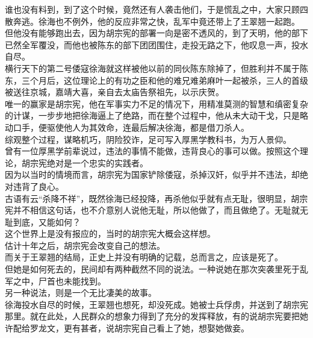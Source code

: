 \begin{multicols}{\theparacolNo}
谁也没有料到，到了这个时候，竟然还有人袭击他们，于是慌乱之中，大家只顾四散奔逃。徐海也不例外，他的反应非常之快，乱军中竟还带上了王翠翘一起跑。\\

但他没有能够跑出去，因为胡宗宪的部署一向是密不透风的，到了天明，他的部下已然全军覆没，而他也被陈东的部下团团围住，走投无路之下，他叹息一声，投水自尽。\\

横行天下的第二号倭寇徐海就这样被他以前的同伙陈东除掉了，但胜利并不属于陈东，三个月后，这位理论上的有功之臣和他的难兄难弟麻叶一起被杀，三人的首级被送往京城，嘉靖大喜，亲自去太庙告祭祖先，以示庆贺。\\

唯一的赢家是胡宗宪，他在军事实力不足的情况下，用精准莫测的智慧和缜密复杂的计谋，一步步地把徐海逼上了绝路，而在整个过程中，他从未大动干戈，只是略动口手，便驱使他人为其效命，连最后解决徐海，都是借刀杀人。\\

综观整个过程，谋略机巧，阴险狡诈，足可写入厚黑学教科书，为万人景仰。\\

曾有一位厚黑学前辈说过，违法的事情不能做，违背良心的事可以做。按照这个理论，胡宗宪绝对是一个忠实的实践者。\\

因为以当时的情境而言，胡宗宪为国家铲除倭寇，杀掉汉奸，似乎并不违法，却绝对违背了良心。\\

古语有云“杀降不祥”，既然徐海已经投降，再杀他似乎就有点无耻，很明显，胡宗宪并不相信这句话，也不介意别人说他无耻，所以他做了，而且做绝了。无耻就无耻到底，又能如何？\\

这个世界上是没有报应的，当时的胡宗宪大概会这样想。\\

估计十年之后，胡宗宪会改变自己的想法。\\

而关于王翠翘的结局，正史上并没有明确的记载，总而言之，应该是死了。\\

但她是如何死去的，民间却有两种截然不同的说法。一种说她在那次突袭里死于乱军之中，尸首也未能找到。\\

另一种说法，则是一个无比凄美的故事。\\

徐海投水自尽的时候，王翠翘也想死，却没死成。她被士兵俘虏，并送到了胡宗宪那里。就在此处，人民群众的想象力得到了充分的发挥释放，有的说胡宗宪要把她许配给罗龙文，更有甚者，说胡宗宪自己看上了她，想娶她做妾。\\


\end{multicols}
